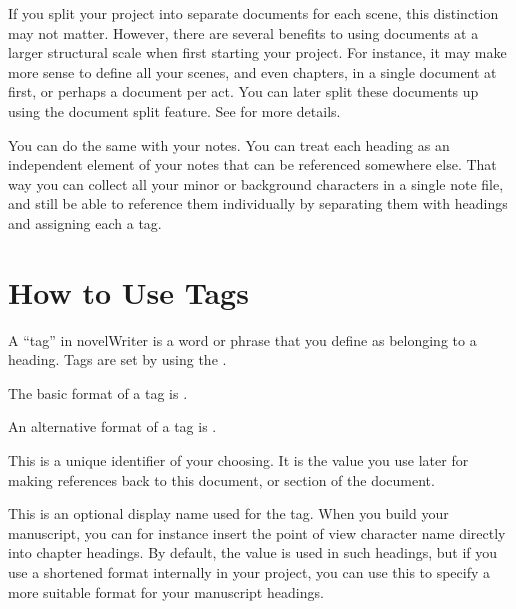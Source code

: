\documentclass[a4paper,11pt,english]{sphinxmanual}
\begin{document}
\sphinxAtStartPar
If you split your project into separate documents for each scene, this distinction may not matter.
However, there are several benefits to using documents at a larger structural scale when first
starting your project. For instance, it may make more sense to define all your scenes, and even
chapters, in a single document at first, or perhaps a document per act. You can later split these
documents up using the document split feature. See {\hyperref[\detokenize{usage_project:a-ui-tree-split-merge}]{}} for more details.

\sphinxAtStartPar
You can do the same with your notes. You can treat each heading as an independent element of your
notes that can be referenced somewhere else. That way you can collect all your minor or background
characters in a single note file, and still be able to reference them individually by separating
them with headings and assigning each a tag.


\section{How to Use Tags}
\label{\detokenize{project_references:how-to-use-tags}}\label{\detokenize{project_references:a-references-tags}}
\sphinxAtStartPar
A “tag” in novelWriter is a word or phrase that you define as belonging to a heading. Tags are set
by using the  {\hyperref[\detokenize{int_glossary:term-Keyword}]{}}.

\sphinxAtStartPar
The basic format of a tag is .

\sphinxAtStartPar
An alternative format of a tag is .
\begin{description}
\sphinxAtStartPar
This is a unique identifier of your choosing. It is the value you use later for making
references back to this document, or section of the document.

\sphinxAtStartPar
This is an optional display name used for the tag. When you build your manuscript, you can for
instance insert the point of view character name directly into chapter headings. By default, the
 value is used in such headings, but if you use a shortened format internally in your
project, you can use this to specify a more suitable format for your manuscript headings.

\end{description}
\end{document}
